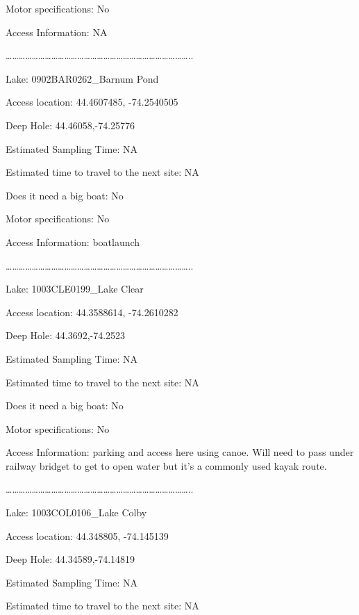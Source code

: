 \documentclass[]{article}
\begin{document}
Motor specifications: No

Access Information: NA

\ldots{}\ldots{}\ldots{}\ldots{}\ldots{}\ldots{}\ldots{}\ldots{}\ldots{}\ldots{}\ldots{}\ldots{}\ldots{}\ldots{}\ldots{}\ldots{}\ldots{}\ldots{}\ldots{}\ldots{}\ldots{}\ldots{}\ldots{}\ldots{}\ldots{}\ldots{}\ldots{}\ldots{}..

Lake: 0902BAR0262\_Barnum Pond

Access location: 44.4607485, -74.2540505

Deep Hole: 44.46058,-74.25776

Estimated Sampling Time: NA

Estimated time to travel to the next site: NA

Does it need a big boat: No

Motor specifications: No

Access Information: boatlaunch

\ldots{}\ldots{}\ldots{}\ldots{}\ldots{}\ldots{}\ldots{}\ldots{}\ldots{}\ldots{}\ldots{}\ldots{}\ldots{}\ldots{}\ldots{}\ldots{}\ldots{}\ldots{}\ldots{}\ldots{}\ldots{}\ldots{}\ldots{}\ldots{}\ldots{}\ldots{}\ldots{}\ldots{}..

Lake: 1003CLE0199\_Lake Clear

Access location: 44.3588614, -74.2610282

Deep Hole: 44.3692,-74.2523

Estimated Sampling Time: NA

Estimated time to travel to the next site: NA

Does it need a big boat: No

Motor specifications: No

Access Information: parking and access here using canoe. Will need to
pass under railway bridget to get to open water but it's a commonly used
kayak route.

\ldots{}\ldots{}\ldots{}\ldots{}\ldots{}\ldots{}\ldots{}\ldots{}\ldots{}\ldots{}\ldots{}\ldots{}\ldots{}\ldots{}\ldots{}\ldots{}\ldots{}\ldots{}\ldots{}\ldots{}\ldots{}\ldots{}\ldots{}\ldots{}\ldots{}\ldots{}\ldots{}\ldots{}..

Lake: 1003COL0106\_Lake Colby

Access location: 44.348805, -74.145139

Deep Hole: 44.34589,-74.14819

Estimated Sampling Time: NA

Estimated time to travel to the next site: NA
\end{document}
